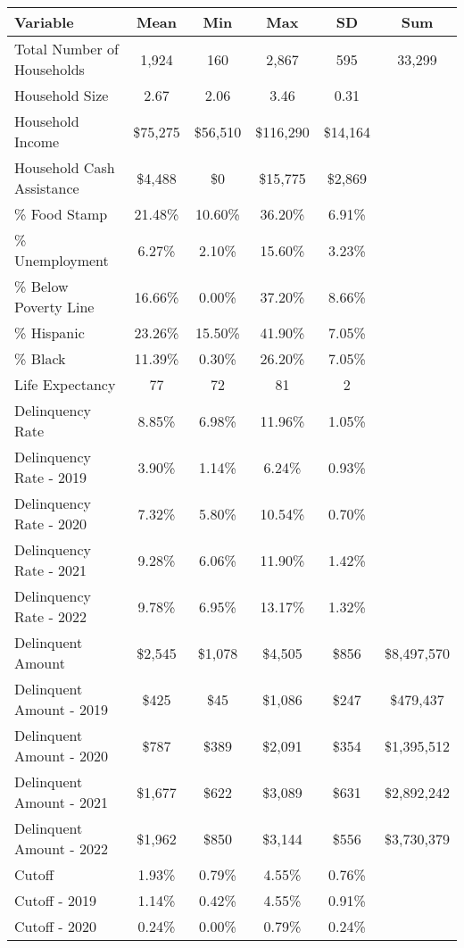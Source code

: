 \begin{tabular}{l|c|c|c|c|c}
\toprule 
\midrule 
Variable & Mean & Min & Max & SD & Sum \\
\midrule 
Total Number of Households & 1,924 & 160 & 2,867 & 595 & 33,299 \\
\quad Household Size & 2.67 & 2.06 & 3.46 & 0.31 \\
Household Income & \$75,275 & \$56,510 & \$116,290 & \$14,164 \\
\quad Household Cash Assistance & \$4,488 & \$0 & \$15,775 & \$2,869 \\
\% Food Stamp & 21.48\% & 10.60\% & 36.20\% & 6.91\% \\
\% Unemployment & 6.27\% & 2.10\% & 15.60\% & 3.23\% \\
\% Below Poverty Line & 16.66\% & 0.00\% & 37.20\% & 8.66\% \\
\% Hispanic & 23.26\% & 15.50\% & 41.90\% & 7.05\% \\
\% Black & 11.39\% & 0.30\% & 26.20\% & 7.05\% \\
Life Expectancy & 77 & 72 & 81 & 2 \\
\midrule 
Delinquency Rate & 8.85\% & 6.98\% & 11.96\% & 1.05\% \\
\quad Delinquency Rate - 2019 & 3.90\% & 1.14\% & 6.24\% & 0.93\% \\
\quad Delinquency Rate - 2020 & 7.32\% & 5.80\% & 10.54\% & 0.70\% \\
\quad Delinquency Rate - 2021 & 9.28\% & 6.06\% & 11.90\% & 1.42\% \\
\quad Delinquency Rate - 2022 & 9.78\% & 6.95\% & 13.17\% & 1.32\% \\
\midrule 
Delinquent Amount & \$2,545 & \$1,078 & \$4,505 & \$856 & \$8,497,570 \\
\quad Delinquent Amount - 2019 & \$425 & \$45 & \$1,086 & \$247 & \$479,437 \\
\quad Delinquent Amount - 2020 & \$787 & \$389 & \$2,091 & \$354 & \$1,395,512 \\
\quad Delinquent Amount - 2021 & \$1,677 & \$622 & \$3,089 & \$631 & \$2,892,242 \\
\quad Delinquent Amount - 2022 & \$1,962 & \$850 & \$3,144 & \$556 & \$3,730,379 \\
\midrule 
Cutoff & 1.93\% & 0.79\% & 4.55\% & 0.76\% \\
\quad Cutoff - 2019 & 1.14\% & 0.42\% & 4.55\% & 0.91\% \\
\quad Cutoff - 2020 & 0.24\% & 0.00\% & 0.79\% & 0.24\% \\

\end{tabular}
